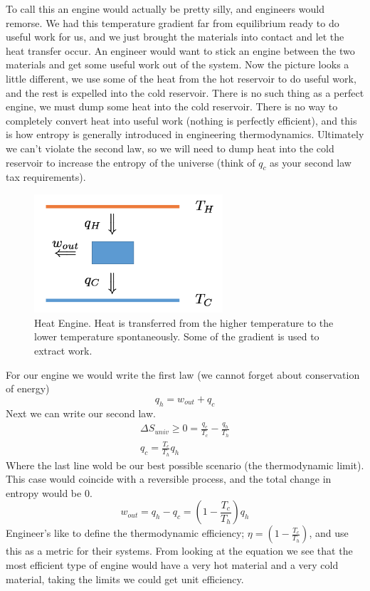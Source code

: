 \documentclass{article}
\begin{document}
To call this an engine would actually be pretty silly, and engineers would remorse.
We had this temperature gradient far from equilibrium ready to do useful work for us, and we just brought the materials into contact and let the heat transfer occur. 
An engineer would want to stick an engine between the two materials and get some useful work out of the system. 
Now the picture looks a little different, we use some of the heat from the hot reservoir to do useful work, and the rest is expelled into the cold reservoir. 
There is no such thing as a perfect engine, we must dump some heat into the cold reservoir.
There is no way to completely convert heat into useful work (nothing is perfectly efficient), and this is how entropy is generally introduced in engineering thermodynamics. 
Ultimately we can't violate the second law, so we will need to dump heat into the cold reservoir to increase the entropy of the universe (think of $q_c$ as your second law tax requirements). 

\begin{figure}[! h]
    \centering
    \includegraphics[width=7cm]{heat_engine.png}
    \caption{Heat Engine. Heat is transferred from the higher temperature to the lower temperature spontaneously. Some of the gradient is used to extract work.}
    \label{fig:engine}
\end{figure}

For our engine we would write the first law (we cannot forget about conservation of energy)
\begin{equation}
q_h = w_{out} + q_c
\end{equation} 
Next we can write our second law. 
\begin{equation}
\begin{split}
\Delta S_{univ} \geq 0 = \frac{q_c}{T_c} - \frac{q_h}{T_h}\\
q_c = \frac{T_c}{T_h}q_h
\end{split}
\end{equation}
Where the last line wold be our best possible scenario (the thermodynamic limit). 
This case would coincide with a reversible process, and the total change in entropy would be 0. 
\begin{equation}
w_{out} = q_h - q_c = \left( 1 - \frac{T_c}{T_h}\right)q_h 
\end{equation}
Engineer's like to define the thermodynamic efficiency; $\eta = \left( 1 - \frac{T_c}{T_h}\right)$, and use this as a metric for their systems.  
From looking at the equation we see that the most efficient type of engine would have a very hot material and a very cold material, taking the limits we could get unit efficiency. 
\end{document}
